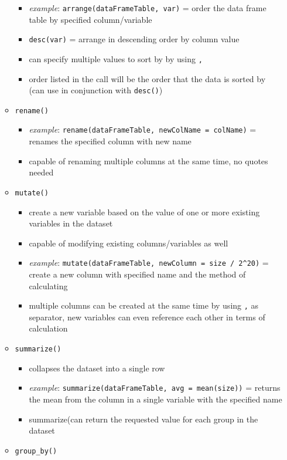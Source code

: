\documentclass[
]{article}
\providecommand{\tightlist}{%
  \setlength{\itemsep}{0pt}\setlength{\parskip}{0pt}}
\begin{document}
\begin{itemize}
\begin{itemize}
    \begin{itemize}
    \tightlist
    \item
      \emph{example}: \texttt{arrange(dataFrameTable,\ var)} = order the
      data frame table by specified column/variable
    \item
      \texttt{desc(var)} = arrange in descending order by column value
    \item
      can specify multiple values to sort by by using \texttt{,}
    \item
      order listed in the call will be the order that the data is sorted
      by (can use in conjunction with \texttt{desc()})
    \end{itemize}
  \item
    \texttt{rename()}

    \begin{itemize}
    \tightlist
    \item
      \emph{example}:
      \texttt{rename(dataFrameTable,\ newColName\ =\ colName)} = renames
      the specified column with new name
    \item
      capable of renaming multiple columns at the same time, no quotes
      needed
    \end{itemize}
  \item
    \texttt{mutate()}

    \begin{itemize}
    \tightlist
    \item
      create a new variable based on the value of one or more existing
      variables in the dataset
    \item
      capable of modifying existing columns/variables as well
    \item
      \emph{example}:
      \texttt{mutate(dataFrameTable,\ newColumn\ =\ size\ /\ 2\^{}20)} =
      create a new column with specified name and the method of
      calculating
    \item
      multiple columns can be created at the same time by using
      \texttt{,} as separator, new variables can even reference each
      other in terms of calculation
    \end{itemize}
  \item
    \texttt{summarize()}

    \begin{itemize}
    \tightlist
    \item
      collapses the dataset into a single row
    \item
      \emph{example}:
      \texttt{summarize(dataFrameTable,\ avg\ =\ mean(size))} = returns
      the mean from the column in a single variable with the specified
      name
    \item
      summarize(can return the requested value for each group in the
      dataset
    \end{itemize}
  \item
    \texttt{group\_by()}


\end{itemize}
\end{itemize}
\end{document}
